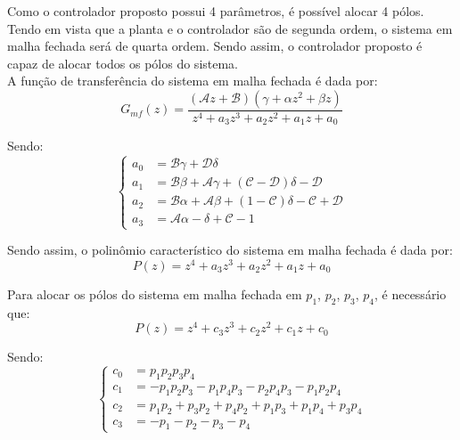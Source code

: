 \documentclass[]{politex}
\begin{document}
Como o controlador proposto possui 4 parâmetros, é possível alocar 4 pólos. Tendo em vista que a planta e o controlador são de segunda ordem, o sistema em malha fechada será de quarta ordem. Sendo assim, o controlador proposto é capaz de alocar todos os pólos do sistema. \\

A função de transferência do sistema em malha fechada é dada por:
\begin{equation}
G_{mf}(z) = \frac{(\mathcal{A} z+\mathcal{B}) \left(\gamma +\alpha  z^2+\beta  z\right)}{z^4 + a_3 z^3 + a_2 z^2 + a_1 z + a_0}
\end{equation}

Sendo:
\begin{equation}
\begin{cases}
a_0 &=  \mathcal{B} \gamma  + \mathcal{D} \delta\\
a_1 &= \mathcal{B} \beta + \mathcal{A} \gamma +(\mathcal{C}  -  \mathcal{D}) \delta -\mathcal{D}   \\
a_2 &= \mathcal{B} \alpha + \mathcal{A} \beta + (1 -\mathcal{C}) \delta -\mathcal{C} +\mathcal{D}  \\
a_3 &=   \mathcal{A} \alpha -\delta +\mathcal{C} -1
\end{cases}
\end{equation}



Sendo assim, o polinômio característico do sistema em malha fechada é dada por:
\begin{equation}
P(z) = z^4 + a_3 z^3 + a_2 z^2 + a_1 z + a_0
\end{equation}

Para alocar os pólos do sistema em malha fechada em $p_1$, $p_2$, $p_3$, $p_4$, é necessário que:
\begin{equation}
P(z) = z^4 + c_3 z^3 + c_2 z^2 + c_1 z + c_0
\end{equation}

Sendo:
\begin{equation}
\begin{cases}
c_0 &= p_1 p_2 p_3 p_4 \\
c_1 &= -p_1 p_2 p_3-p_1 p_4 p_3-p_2 p_4 p_3-p_1 p_2 p_4 \\
c_2 &= p_1 p_2+p_3 p_2+p_4 p_2+p_1 p_3+p_1 p_4+p_3 p_4 \\
c_3 &= -p_1-p_2-p_3-p_4
\end{cases}
\end{equation}
\end{document}
